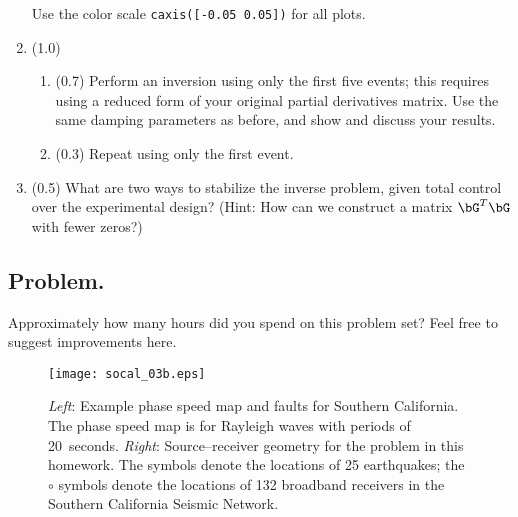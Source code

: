 \documentclass[11pt,titlepage,fleqn]{article}
\begin{document}
\begin{enumerate}
Use the color scale \verb+caxis([-0.05 0.05])+ for all plots.

\pagebreak
\item (1.0)
%
\begin{enumerate}
\item (0.7) Perform an inversion using only the first five events; this requires using a reduced form of your original partial derivatives matrix. Use the same damping parameters as before, and show and discuss your results.

\item (0.3) Repeat using only the first event.
\end{enumerate}

\item (0.5) What are two ways to stabilize the inverse problem, given total control over the experimental design?  (Hint: How can we construct a matrix $\bG^T\bG$ with fewer zeros?)

\end{enumerate}


\subsection*{Problem.}

Approximately how many hours did you spend on this problem set? Feel free to suggest improvements here.




\begin{figure}[h]
\centering
\texttt{[image: socal\_03b.eps]}
\caption[Source--receiver geometry for southern California]
{{
{\em Left}: Example phase speed map and faults for Southern California. The phase speed map is for Rayleigh waves with periods of 20~seconds.
{\em Right}: Source--receiver geometry for the problem in this homework. The  symbols denote the locations of 25 earthquakes; the $\circ$ symbols denote the locations of 132 broadband receivers in the Southern California Seismic Network.
\label{fig:geometry}
}}
\end{figure}
\end{document}
